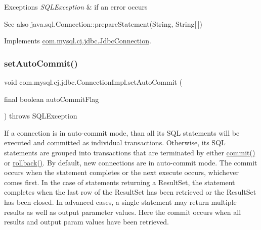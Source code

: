 \begin{DoxyExceptions}{Exceptions}
{\em S\+Q\+L\+Exception} & if an error occurs\\
\hline
\end{DoxyExceptions}
\begin{DoxySeeAlso}{See also}
java.\+sql.\+Connection\+::prepare\+Statement(\+String, String\mbox{[}$\,$\mbox{]}) 
\end{DoxySeeAlso}


Implements \mbox{\hyperlink{interfacecom_1_1mysql_1_1cj_1_1jdbc_1_1_jdbc_connection_aa15ffc32d47d1950257c4720802694bf}{com.\+mysql.\+cj.\+jdbc.\+Jdbc\+Connection}}.

\mbox{\label{classcom_1_1mysql_1_1cj_1_1jdbc_1_1_connection_impl_a53c90790a0e3d5c1ebae0278a15453be}} 
\subsubsection{\texorpdfstring{set\+Auto\+Commit()}{setAutoCommit()}}
{\footnotesize\ttfamily void com.\+mysql.\+cj.\+jdbc.\+Connection\+Impl.\+set\+Auto\+Commit (\begin{DoxyParamCaption}\item[{final boolean}]{auto\+Commit\+Flag }\end{DoxyParamCaption}) throws S\+Q\+L\+Exception}

If a connection is in auto-\/commit mode, than all its S\+QL statements will be executed and committed as individual transactions. Otherwise, its S\+QL statements are grouped into transactions that are terminated by either \mbox{\hyperlink{classcom_1_1mysql_1_1cj_1_1jdbc_1_1_connection_impl_ac6218bc1a284e67ff9557bdefc52c388}{commit()}} or \mbox{\hyperlink{classcom_1_1mysql_1_1cj_1_1jdbc_1_1_connection_impl_adb29692483164e8c98dbeb9c6eb5a972}{rollback()}}. By default, new connections are in auto-\/commit mode. The commit occurs when the statement completes or the next execute occurs, whichever comes first. In the case of statements returning a Result\+Set, the statement completes when the last row of the Result\+Set has been retrieved or the Result\+Set has been closed. In advanced cases, a single statement may return multiple results as well as output parameter values. Here the commit occurs when all results and output param values have been retrieved.


